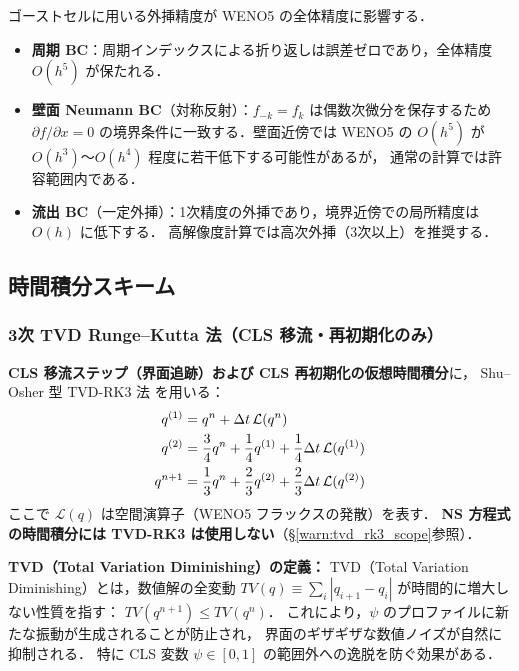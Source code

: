 \begin{tcolorbox}[warnbox, title={境界ゴーストセルの精度への影響}]
ゴーストセルに用いる外挿精度が WENO5 の全体精度に影響する．

\begin{itemize}
  \item \textbf{周期 BC}：周期インデックスによる折り返しは誤差ゼロであり，全体精度 $O(h^5)$ が保たれる．
  \item \textbf{壁面 Neumann BC}（対称反射）：$f_{-k} = f_k$ は偶数次微分を保存するため
        $\partial f/\partial x = 0$ の境界条件に一致する．壁面近傍では
        WENO5 の $O(h^5)$ が $O(h^3)$〜$O(h^4)$ 程度に若干低下する可能性があるが，
        通常の計算では許容範囲内である．
  \item \textbf{流出 BC}（一定外挿）：1次精度の外挿であり，境界近傍での局所精度は $O(h)$ に低下する．
        高解像度計算では高次外挿（3次以上）を推奨する．
\end{itemize}
\end{tcolorbox}

\subsection{時間積分スキーム}
\label{sec:time_int}

\subsubsection{3次 TVD Runge--Kutta 法（CLS 移流・再初期化のみ）}

\textbf{CLS 移流ステップ（界面追跡）および CLS 再初期化の仮想時間積分}に，
Shu--Osher 型 TVD-RK3 法 \cite{ShuOsher1988} を用いる：
\begin{align}
  q^{(1)} &= q^n + \Delta t \, \mathcal{L}(q^n) \notag\\
  q^{(2)} &= \frac{3}{4}q^n + \frac{1}{4}q^{(1)} + \frac{1}{4}\Delta t\,\mathcal{L}(q^{(1)}) \notag\\
  q^{n+1} &= \frac{1}{3}q^n + \frac{2}{3}q^{(2)} + \frac{2}{3}\Delta t\,\mathcal{L}(q^{(2)})
  \label{eq:tvd_rk3}
\end{align}
ここで $\mathcal{L}(q)$ は空間演算子（WENO5 フラックスの発散）を表す．
\textbf{NS 方程式の時間積分には TVD-RK3 は使用しない}（§\ref{warn:tvd_rk3_scope}参照）．

\noindent\textbf{TVD（Total Variation Diminishing）の定義：}
TVD（Total Variation Diminishing）とは，数値解の全変動
$TV(q) \equiv \sum_i |q_{i+1} - q_i|$ が時間的に増大しない性質を指す：
$TV(q^{n+1}) \leq TV(q^n)$．
これにより，$\psi$ のプロファイルに新たな振動が生成されることが防止され，
界面のギザギザな数値ノイズが自然に抑制される．
特に CLS 変数 $\psi \in [0,1]$ の範囲外への逸脱を防ぐ効果がある．

